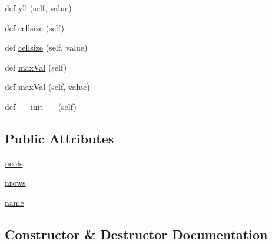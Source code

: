 \begin{DoxyCompactItemize}
\item 
def \mbox{\hyperlink{classbridges_1_1data__src__dependent_1_1elevation_1_1_ele_data_aa5ccf794da0100fc90874290f1c4f118}{yll}} (self, value)
\item 
def \mbox{\hyperlink{classbridges_1_1data__src__dependent_1_1elevation_1_1_ele_data_ab8ca9c8913aae0d352e4472069d24bfe}{cellsize}} (self)
\item 
def \mbox{\hyperlink{classbridges_1_1data__src__dependent_1_1elevation_1_1_ele_data_a70f2d2999f6444b12a43e32f78e618fc}{cellsize}} (self, value)
\item 
def \mbox{\hyperlink{classbridges_1_1data__src__dependent_1_1elevation_1_1_ele_data_a199ae38c535c5f54c86f7493d3fb4ac0}{max\+Val}} (self)
\item 
def \mbox{\hyperlink{classbridges_1_1data__src__dependent_1_1elevation_1_1_ele_data_a992a646ecb76f31fa84cd5fe149eb316}{max\+Val}} (self, value)
\item 
def \mbox{\hyperlink{classbridges_1_1data__src__dependent_1_1elevation_1_1_ele_data_a8fbffdee46235f5698da66c075676cb4}{\+\_\+\+\_\+init\+\_\+\+\_\+}} (self)
\end{DoxyCompactItemize}
\subsection*{Public Attributes}
\begin{DoxyCompactItemize}
\item 
\mbox{\hyperlink{classbridges_1_1data__src__dependent_1_1elevation_1_1_ele_data_a01622cab9ec625d57120f195c82e2c4e}{ncols}}
\item 
\mbox{\hyperlink{classbridges_1_1data__src__dependent_1_1elevation_1_1_ele_data_a9451760998220fcc4e214842fa5a5f65}{nrows}}
\item 
\mbox{\hyperlink{classbridges_1_1data__src__dependent_1_1elevation_1_1_ele_data_a431422aff25816133deb0e1da55397bb}{name}}
\end{DoxyCompactItemize}


\subsection{Constructor \& Destructor Documentation}
\mbox{\label{classbridges_1_1data__src__dependent_1_1elevation_1_1_ele_data_a8fbffdee46235f5698da66c075676cb4}} 
